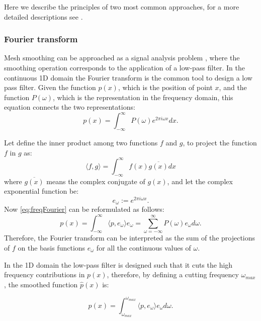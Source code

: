 Here we describe the principles of two most common approaches, for a more detailed descriptions see \cite{botsch2010polygon,taubin1995signal,taubinygeometric,sorkine2005laplacian}.
\subsubsection{Fourier transform}
Mesh smoothing can be approached as a signal analysis problem \cite{taubin1995signal}, where the smoothing operation corresponds to the application of a low-pass filter.
In the continuous 1D domain the Fourier transform is the common tool to design a low pass filter.
Given the function $p(x)$, which is the position of point $x$, and the function $P(\omega)$, which is the representation in the frequency domain, this equation connects the two representations:
\begin{equation}
p(x) = \int_{-\infty}^{\infty} P(\omega) e^{2\pi i\omega x}dx.
\label{eq:freqFourier}  
\end{equation}

Let define the inner product among two functions $f$ and $g$, to project the function $f$ in $g$ as:
\begin{equation}
\langle f,g\rangle = \int_{-\infty}^{\infty} f(x) \overline{g(x)} dx
\end{equation}
where $\overline{g(x)}$ means the complex conjugate of $g(x)$, and let the complex exponential function be:
\begin{equation}
e_{\omega} := e^{2\pi i\omega x}.
\end{equation}
Now \eqref{eq:freqFourier}  can be reformulated as follows:
\begin{equation}
p(x) = \int_{-\infty}^{\infty} \langle p, e_{\omega}\rangle e_{\omega} = \sum_{\omega = -\infty}^{\infty} P(\omega) e_{\omega} d\omega.
\label{eq:continuousFourier}  
\end{equation}
Therefore, the Fourier transform can be interpreted as the sum of the projections of $f$ on the basis functions $e_{\omega}$ for all the continuous values of $\omega$.


In the 1D domain the low-pass filter is designed such that it cuts the high frequency contributions in $p(x)$, therefore, by defining a cutting frequency $\omega_{max}$, the smoothed function $\widehat{p}(x)$ is:

\begin{equation}
\label{eq:lowpasscontinuousFourier}
\widehat{p}(x) = \int_{\omega_{max}}^{\omega_{max}} \langle p, e_{\omega}\rangle  e_{\omega}d\omega.
\end{equation}

